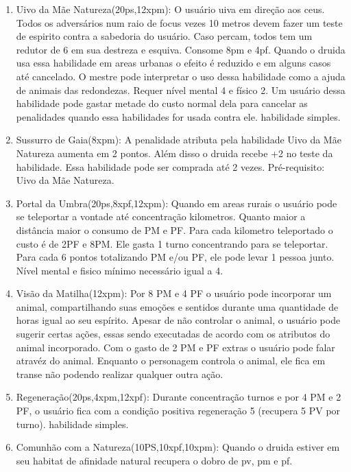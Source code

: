 \begin{enumerate}
  	\item Uivo da Mãe Natureza(20ps,12xpm): O usuário uiva em direção aos ceus. Todos os adversários num raio de focus vezes 10 metros devem fazer um teste de espirito contra a sabedoria do usuário. Caso percam, todos tem um redutor de 6 em sua destreza e esquiva. Consome 8pm e 4pf. Quando o druida usa essa habilidade em areas urbanas o efeito é reduzido e em alguns casos até cancelado. O mestre pode interpretar o uso dessa habilidade como a ajuda de animais das redondezas. Requer nível mental 4 e físico 2. Um usuário dessa habilidade pode gastar metade do custo normal dela para cancelar as penalidades quando essa habilidades for usada contra ele. habilidade simples. 
	  
    \item Sussurro de Gaia(8xpm): A penalidade atributa pela habilidade Uivo da Mãe Natureza aumenta em 2 pontos. Além disso o druida recebe +2 no teste da habilidade. Essa habilidade pode ser comprada até 2 vezes. Pré-requisito: Uivo da Mãe Natureza.
  
  	\item Portal da Umbra(20ps,8xpf,12xpm): Quando em areas rurais o usuário pode se teleportar a vontade até concentração kilometros. Quanto maior a distância maior o consumo de PM e PF. Para cada kilometro teleportado o custo é de 2PF e 8PM. Ele gasta 1 turno concentrando para se teleportar. Para cada 6 pontos totalizando PM e/ou PF, ele pode levar 1 pessoa junto.  Nível mental e fisico mínimo necessário  igual a 4.
  
  	\item Visão da Matilha(12xpm): Por 8 PM e 4 PF o usuário pode incorporar um animal, compartilhando suas emoções e sentidos durante uma quantidade de horas igual ao seu espírito. Apesar de não controlar o animal, o usuário pode sugerir certas ações, essas sendo executadas de acordo com os atributos do animal incorporado. Com o gasto de 2 PM e PF extras o usuário pode falar atravéz do animal. Enquanto o personagem controla o animal, ele fica em transe não podendo realizar qualquer outra ação.
  
    \item Regeneração(20ps,4xpm,12xpf): Durante concentração turnos e por 4 PM e 2 PF, o usuário fica com a condição positiva regeneração 5 (recupera 5 PV por turno). habilidade simples.

		\item Comunhão com a Natureza(10PS,10xpf,10xpm): Quando o druida estiver em seu habitat de afinidade natural recupera o dobro de pv, pm e pf.  


\end{enumerate}

